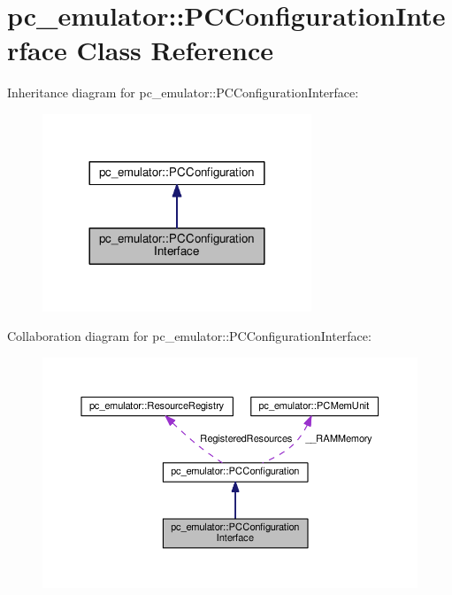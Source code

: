 \hypertarget{classpc__emulator_1_1PCConfigurationInterface}{}\section{pc\+\_\+emulator\+:\+:P\+C\+Configuration\+Interface Class Reference}
\label{classpc__emulator_1_1PCConfigurationInterface}


Inheritance diagram for pc\+\_\+emulator\+:\+:P\+C\+Configuration\+Interface\+:\nopagebreak
\begin{figure}[H]
\begin{center}
\leavevmode
\includegraphics[width=228pt]{classpc__emulator_1_1PCConfigurationInterface__inherit__graph}
\end{center}
\end{figure}


Collaboration diagram for pc\+\_\+emulator\+:\+:P\+C\+Configuration\+Interface\+:\nopagebreak
\begin{figure}[H]
\begin{center}
\leavevmode
\includegraphics[width=350pt]{classpc__emulator_1_1PCConfigurationInterface__coll__graph}
\end{center}
\end{figure}

